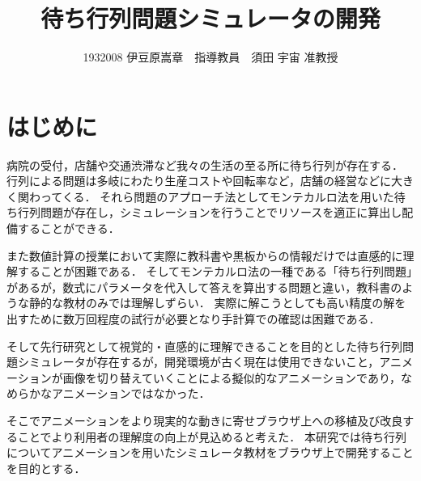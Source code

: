 \documentclass[twocolumn,10pt,a4j]{ltjsarticle}
\title{待ち行列問題シミュレータの開発}
\author{1932008 伊豆原嵩章　指導教員　須田 宇宙 准教授}
\date{}
\begin{document}
\maketitle

\section{はじめに}
病院の受付，店舗や交通渋滞など我々の生活の至る所に待ち行列が存在する．
行列による問題は多岐にわたり生産コストや回転率など，店舗の経営などに大きく関わってくる．
それら問題のアプローチ法としてモンテカルロ法を用いた待ち行列問題が存在し，シミュレーションを行うことでリソースを適正に算出し配備することができる．

また数値計算の授業において実際に教科書や黒板からの情報だけでは直感的に理解することが困難である．
そしてモンテカルロ法の一種である「待ち行列問題」があるが，数式にパラメータを代入して答えを算出する問題と違い，教科書のような静的な教材のみでは理解しずらい．
実際に解こうとしても高い精度の解を出すために数万回程度の試行が必要となり手計算での確認は困難である．

そして先行研究として視覚的・直感的に理解できることを目的とした待ち行列問題シミュレータが存在するが，開発環境が古く現在は使用できないこと，アニメーションが画像を切り替えていくことによる擬似的なアニメーションであり，なめらかなアニメーションではなかった．\cite{past}

そこでアニメーションをより現実的な動きに寄せブラウザ上への移植及び改良することでより利用者の理解度の向上が見込めると考えた．
本研究では待ち行列についてアニメーションを用いたシミュレータ教材をブラウザ上で開発することを目的とする．
\end{document}
